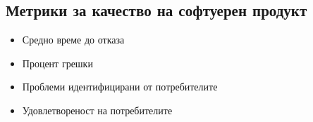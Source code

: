 \documentclass[fleqn,12pt]{article}
\begin{document}
\begin{flushleft}
\section{Метрики за качество на софтуерен продукт}
    \begin{itemize}
        \item Средно време до отказа
        \item Процент грешки
        \item Проблеми идентифицирани от потребителите
        \item Удовлетвореност на потребителите
    \end{itemize}
\end{flushleft}
\end{document}
